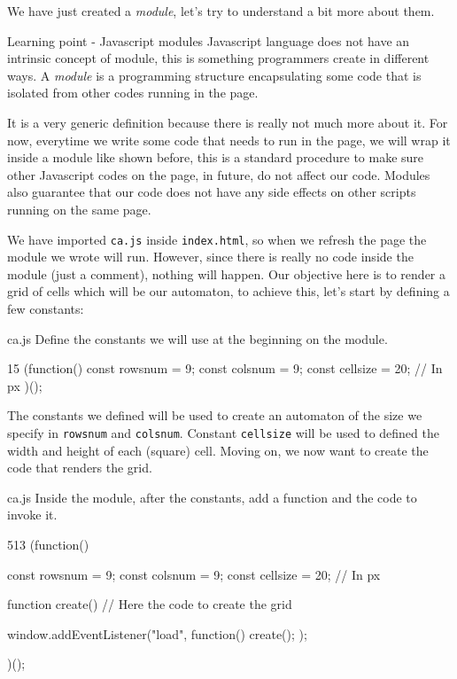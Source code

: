 We have just created a \textit{module}, let's try to understand a bit more about them.

\begin{tips}{Learning point - Javascript modules}
Javascript language does not have an intrinsic concept of module, this is something programmers create in
different ways. A \textit{module} is a programming structure encapsulating some code that is isolated
from other codes running in the page.

It is a very generic definition because there is really not much more about it. For now, everytime
we write some code that needs to run in the page, we will wrap it inside a module like shown before,
this is a standard procedure to make sure other Javascript codes on the page, in future, do not
affect our code. Modules also guarantee that our code does not have any side
effects on other scripts running on the same page.
\end{tips}

We have imported \texttt{ca.js} inside \texttt{index.html}, so when we refresh the page the module
we wrote will run. However, since there is really no code inside the module (just a comment),
nothing will happen. Our objective here is to render a grid of cells which will be our automaton,
to achieve this, let's start by defining a few constants:

\begin{programcode}{ca.js}
Define the constants we will use at the beginning on the module.
\begin{codeh1}{1}{5}
(function(){
  const rowsnum = 9;
  const colsnum = 9;
  const cellsize = 20; // In px
})();
\end{codeh1}
\end{programcode}

The constants we defined will be used to create an automaton of the size we specify in 
\texttt{rowsnum} and \texttt{colsnum}. Constant \texttt{cellsize} will be used to defined the
width and height of each (square) cell. Moving on, we now want to create the code that renders the grid.

\begin{programcode}{ca.js}
Inside the module, after the constants, add a function and the code to invoke it.
\begin{codeh1}{5}{13}
(function(){
  const rowsnum = 9;
  const colsnum = 9;
  const cellsize = 20; // In px

  function create() {
    // Here the code to create the grid
  }

  window.addEventListener("load", function() {
    create();
  });
})();
\end{codeh1}
\end{programcode}

